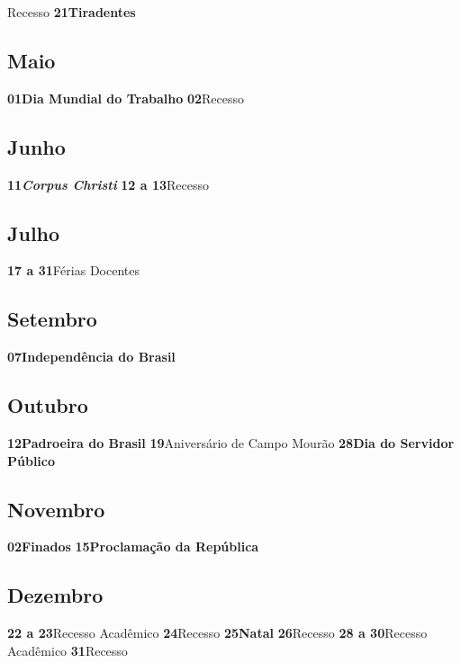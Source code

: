 \documentclass[thesis]{hmcposter}
\begin{document}
\begin{poster}
\quad Recesso \newline\textbf{21}\quad \quad \quad \quad \textbf{Tiradentes} \newline\subsection{Maio}\textbf{01}\quad \quad \quad \quad \textbf{Dia Mundial do Trabalho} \newline\textbf{02}\quad \quad \quad \quad Recesso \newline\subsection{Junho}\textbf{11}\quad \quad \quad \quad \textbf{\textit{Corpus Christi}} \newline\textbf{12 a 13}\quad \quad Recesso \newline\subsection{Julho}\textbf{17 a 31}\quad \quad Férias Docentes \newline\subsection{Setembro}\textbf{07}\quad \quad \quad \quad \textbf{Independência do Brasil} \newline\subsection{Outubro}\textbf{12}\quad \quad \quad \quad \textbf{Padroeira do Brasil} \newline\textbf{19}\quad \quad \quad \quad Aniversário de Campo Mourão \newline\textbf{28}\quad \quad \quad \quad \textbf{Dia do Servidor Público} \newline\subsection{Novembro}\textbf{02}\quad \quad \quad \quad \textbf{Finados} \newline\textbf{15}\quad \quad \quad \quad \textbf{Proclamação da República} \newline\subsection{Dezembro}\textbf{22 a 23}\quad \quad Recesso Acadêmico \newline\textbf{24}\quad \quad \quad \quad Recesso \newline\textbf{25}\quad \quad \quad \quad \textbf{Natal} \newline\textbf{26}\quad \quad \quad \quad Recesso \newline\textbf{28 a 30}\quad \quad Recesso Acadêmico \newline\textbf{31}\quad \quad \quad \quad Recesso \newline\newpage

\end{poster}
\end{document}

